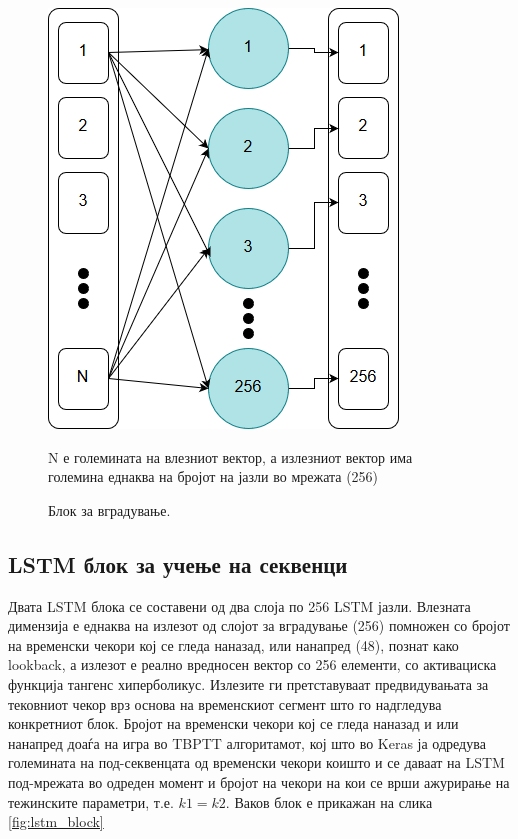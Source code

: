 \begin{figure}[H]
	\centering
    \includegraphics[scale=0.5]{images/embedding_block.png}
	\caption{Блок за вградување.}
	N е големината на влезниот вектор, а излезниот вектор има големина еднаква на бројот на јазли во мрежата (256)
	\label{fig:embedding}
\end{figure}

\subsection{LSTM блок за учење на секвенци}

Двата LSTM блока се составени од два слоја по 256 LSTM јазли. Влезната димензија е еднаква на излезот од слојот за вградување (256) помножен со бројот на временски чекори кој се гледа наназад, или нанапред (48), познат како lookback, а излезот е реално вредносен вектор со 256 елементи, со активациска функција тангенс хиперболикус. Излезите ги претставуваат предвидувањата за тековниот чекор врз основа на временскиот сегмент што го надгледува конкретниот блок. Бројот на временски чекори кој се гледа наназад и или нанапред доаѓа на игра во TBPTT алгоритамот, кој што во Keras ја одредува големината на под-секвенцата од временски чекори коишто и се даваат на LSTM под-мрежата во одреден момент и бројот на чекори на кои се врши ажурирање на тежинските параметри, т.е. $k1=k2$. 
Ваков блок е прикажан на слика \ref{fig:lstm_block}

